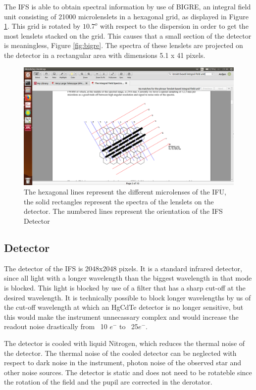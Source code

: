 \documentclass[twoside,single]{lion-msc}
\begin{document}
The IFS is able to obtain spectral information by use of BIGRE, an integral field unit consisting of 21000 microlenslets in a hexagonal grid, as displayed in Figure \ref{fig:bigregrid}. This grid is rotated by $10.7^o$ with respect to the dispersion in order to get the most lenslets stacked on the grid. This causes that a small section of the detector is meaningless, Figure \ref{fig:bigre}. The spectra of these lenslets are projected on the detector in a rectangular area with dimensions 5.1 x 41 pixels. 


\begin{figure}[htbp]
\centering 
\includegraphics[trim={15cm 1.5cm 10cm 8cm},clip,scale = 0.47]{bigregrid}
\caption{The hexagonal lines represent the different microlenses of the IFU, the solid rectangles represent the spectra of the lenslets on the detector. The numbered lines  represent the orientation of the IFS Detector \cite{Claudi2008}} 
\label{fig:bigregrid}
\end{figure}

\subsection{Detector}
The detector of the IFS is 2048x2048 pixels. It is a standard infrared detector, since all light with a longer wavelength than the biggest wavelength in that mode is blocked. This light is blocked by use of a filter that has a sharp cut-off at the desired wavelength. It is technically possible to block longer wavelengths by us of the cut-off wavelength at which an HgCdTe detector is no longer sensitive, but this would make the instrument unnecassary complex and would increase the readout noise drastically from ~10 $e^-$ to ~25$e^-$\citep{Claudi2008}.
\bigskip

The detector is cooled with liquid Nitrogen, which reduces the thermal noise of the detector. The thermal noise of the cooled detector can be neglected with respect to dark noise in the instrument, photon noise of the observed star and other noise sources\citep{Claudi2008}. The detector is static and does not need to be rotateble since the rotation of the field and the pupil are corrected in the derotator. 
\end{document}
